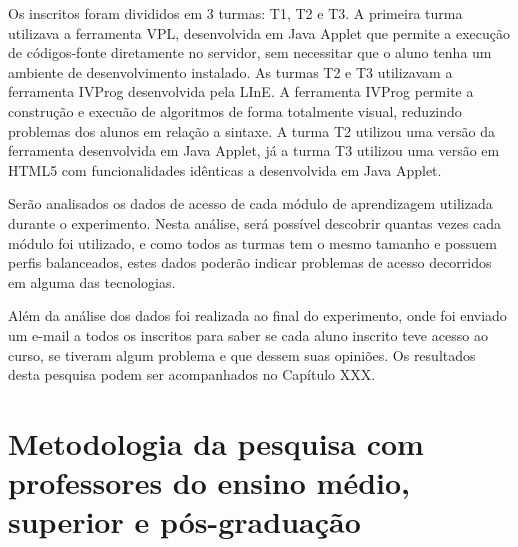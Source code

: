 Os inscritos foram divididos em 3 turmas: T1, T2 e T3. A primeira turma utilizava a ferramenta VPL, desenvolvida em Java Applet que permite a execução de códigos-fonte diretamente no servidor, sem necessitar que o aluno tenha um ambiente de desenvolvimento instalado. As turmas T2 e T3 utilizavam a ferramenta IVProg desenvolvida pela LInE. A ferramenta IVProg permite a construção e execuão de algoritmos de forma totalmente visual, reduzindo problemas dos alunos em relação a sintaxe. A turma T2 utilizou uma versão da ferramenta desenvolvida em Java Applet, já a turma T3 utilizou uma versão em HTML5 com funcionalidades idênticas a desenvolvida em Java Applet.

Serão analisados os dados de acesso de cada módulo de aprendizagem utilizada durante o experimento. Nesta análise, será possível descobrir quantas vezes cada módulo foi utilizado, e como todos as turmas tem o mesmo tamanho e possuem perfis balanceados, estes dados poderão indicar problemas de acesso decorridos em alguma das tecnologias. 

Além da análise dos dados foi realizada ao final do experimento, onde foi enviado um e-mail a todos os inscritos para saber se cada aluno inscrito teve acesso ao curso, se tiveram algum problema e que dessem suas opiniões. Os resultados desta pesquisa podem ser acompanhados no Capítulo XXX.




\section{Metodologia da pesquisa com professores do ensino médio, superior e pós-graduação}
\label{sec:metodologia_professores}

